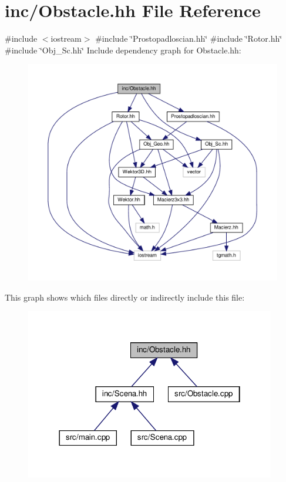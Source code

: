 \hypertarget{_obstacle_8hh}{}\section{inc/\+Obstacle.hh File Reference}
\label{_obstacle_8hh}
{\ttfamily \#include $<$iostream$>$}\newline
{\ttfamily \#include \char`\"{}Prostopadloscian.\+hh\char`\"{}}\newline
{\ttfamily \#include \char`\"{}Rotor.\+hh\char`\"{}}\newline
{\ttfamily \#include \char`\"{}Obj\+\_\+\+Sc.\+hh\char`\"{}}\newline
Include dependency graph for Obstacle.\+hh\+:
\nopagebreak
\begin{figure}[H]
\begin{center}
\leavevmode
\includegraphics[width=350pt]{_obstacle_8hh__incl}
\end{center}
\end{figure}
This graph shows which files directly or indirectly include this file\+:
\nopagebreak
\begin{figure}[H]
\begin{center}
\leavevmode
\includegraphics[width=310pt]{_obstacle_8hh__dep__incl}
\end{center}
\end{figure}
